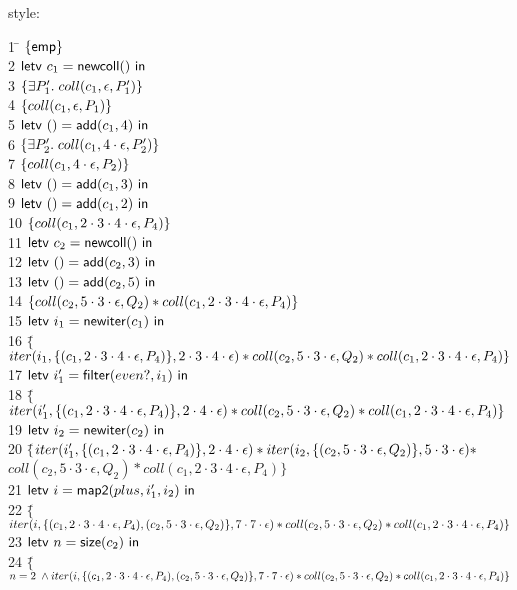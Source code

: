 \documentclass[preprint,natbib]{sigplanconf}
\begin{document}
style: {\small
\begin{tabbing}
1 \qquad \= $\{{\mathsf{emp}}\}$ \\
2 \> $\mbox{\textsf{{letv }}}c_1 = \mbox{\textsf{{newcoll}}}()\mbox{\textsf{{ in }}}$ \\
3 \> $\{{\exists P'_1.\; coll(c_1, \epsilon, P'_1)}\}$ \\
4 \> $\{{coll(c_1, \epsilon, P_1)}\}$ \\
5 \> $\mbox{\textsf{{letv }}}() = \mbox{\textsf{{add}}}(c_1, 4)\mbox{\textsf{{ in }}}$ \\
6 \> $\{{\exists P'_2.\; coll(c_1, 4\cdot\epsilon, P'_2)}\}$ \\
7 \> $\{{coll(c_1, 4\cdot\epsilon, P_2)}\}$ \\
8 \> $\mbox{\textsf{{letv }}}() = \mbox{\textsf{{add}}}(c_1, 3)\mbox{\textsf{{ in }}}$ \\
9 \> $\mbox{\textsf{{letv }}}() = \mbox{\textsf{{add}}}(c_1, 2)\mbox{\textsf{{ in }}}$ \\
10 \> $\{{coll(c_1, 2\cdot3\cdot4\cdot\epsilon, P_4)}\}$ \\
11 \> $\mbox{\textsf{{letv }}}c_2 = \mbox{\textsf{{newcoll}}}()\mbox{\textsf{{ in }}}$ \\
12 \> $\mbox{\textsf{{letv }}}() = \mbox{\textsf{{add}}}(c_2, 3)\mbox{\textsf{{ in }}}$ \\
13 \> $\mbox{\textsf{{letv }}}() = \mbox{\textsf{{add}}}(c_2, 5)\mbox{\textsf{{ in }}}$ \\
14\> $\{{coll(c_2, 5\cdot3\cdot\epsilon, Q_2) * coll(c_1, 2\cdot3\cdot4\cdot\epsilon, P_4)}\}$ \\
15\> $\mbox{\textsf{{letv }}}i_1 = \mbox{\textsf{{newiter}}}(c_1)\mbox{\textsf{{ in }}}$ \\
16\> $\{$\=$iter(i_1, \{{(c_1, 2\cdot3\cdot4\cdot\epsilon, P_4)}\}, 2\cdot3\cdot4\cdot\epsilon) * 
  coll(c_2, 5\cdot3\cdot\epsilon, Q_2) * coll(c_1, 2\cdot3\cdot4\cdot\epsilon, P_4)\}$ \\
17 \> $\mbox{\textsf{{letv }}}i'_1 = \mbox{\textsf{{filter}}}(even?, i_1)\mbox{\textsf{{ in }}}$ \\
18 \> $\{$\=$iter(i'_1, \{{(c_1, 2\cdot3\cdot4\cdot\epsilon, P_4)}\}, 2\cdot4\cdot\epsilon) * 
coll(c_2, 5\cdot3\cdot\epsilon, Q_2) * coll(c_1, 2\cdot3\cdot4\cdot\epsilon, P_4)\}$ \\
19 \> $\mbox{\textsf{{letv }}}i_2 = \mbox{\textsf{{newiter}}}(c_2)\mbox{\textsf{{ in }}}$ \\
20 \> $\{$\=$iter(i'_1, \{{(c_1, 2\cdot3\cdot4\cdot\epsilon, P_4)}\}, 2\cdot4\cdot\epsilon) * 
iter(i_2, \{{(c_2, 5\cdot3\cdot\epsilon, Q_2)}\}, 5\cdot3\cdot\epsilon) *$ \\
\> \> $coll(c_2, 5\cdot3\cdot\epsilon, Q_2) * coll(c_1, 2\cdot3\cdot4\cdot\epsilon, P_4)\}$ \\
21 \> $\mbox{\textsf{{letv }}}i = \mbox{\textsf{{map2}}}(plus, i'_1, i_2)\mbox{\textsf{{ in }}}$ \\
22 \> $\{$\=$iter(i, \{{(c_1, 2\cdot3\cdot4\cdot\epsilon, P_4), (c_2, 5\cdot3\cdot\epsilon, Q_2)}\}, 7\cdot7\cdot\epsilon) * 
coll(c_2, 5\cdot3\cdot\epsilon, Q_2) * coll(c_1, 2\cdot3\cdot4\cdot\epsilon, P_4)\}$ \\
23 \> $\mbox{\textsf{{letv }}}n = \mbox{\textsf{{size}}}(c_2)\mbox{\textsf{{ in }}}$ \\
24 \> $\{$\=$n = 2 \;\land
iter(i, \{{(c_1, 2\cdot3\cdot4\cdot\epsilon, P_4), (c_2, 5\cdot3\cdot\epsilon, Q_2)}\}, 7\cdot7\cdot\epsilon) * 
coll(c_2, 5\cdot3\cdot\epsilon, Q_2) * coll(c_1, 2\cdot3\cdot4\cdot\epsilon, P_4)\}$ \\


\end{tabbing}}
\end{document}
